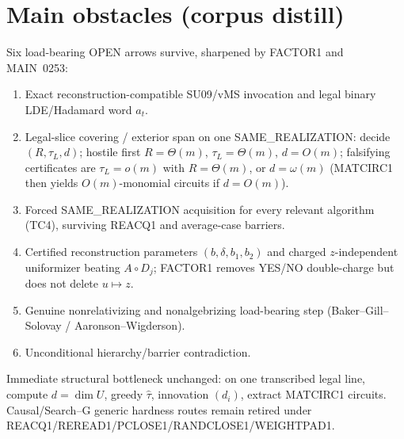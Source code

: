 \documentclass[11pt]{article}
\begin{document}
\section*{Main obstacles (corpus distill)}
Six load-bearing OPEN arrows survive, sharpened by FACTOR1 and MAIN~0253:
\begin{enumerate}
\item Exact reconstruction-compatible SU09/vMS invocation and legal binary LDE/Hadamard word $a_t$.
\item Legal-slice covering / exterior span on one SAME\_REALIZATION: decide $(R,\tau_L,d)$;
hostile first $R=\Theta(m)$, $\tau_L=\Theta(m)$, $d=O(m)$; falsifying certificates are
$\tau_L=o(m)$ with $R=\Theta(m)$, or $d=\omega(m)$ (MATCIRC1 then yields $O(m)$-monomial
circuits if $d=O(m)$).
\item Forced SAME\_REALIZATION acquisition for every relevant algorithm (TC4), surviving
REACQ1 and average-case barriers.
\item Certified reconstruction parameters $(b,\delta,b_1,b_2)$ and charged $z$-independent
uniformizer beating $A\circ D_j$; FACTOR1 removes YES/NO double-charge but does not delete
$u\mapsto z$.
\item Genuine nonrelativizing and nonalgebrizing load-bearing step
(Baker--Gill--Solovay / Aaronson--Wigderson).
\item Unconditional hierarchy/barrier contradiction.
\end{enumerate}
Immediate structural bottleneck unchanged: on one transcribed legal line, compute
$d=\dim U$, greedy $\widehat\tau$, innovation $(d_i)$, extract MATCIRC1 circuits.
Causal/Search--G generic hardness routes remain retired under
REACQ1/REREAD1/PCLOSE1/RANDCLOSE1/WEIGHTPAD1.
\end{document}
